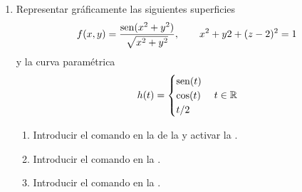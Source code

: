 \begin{enumerate}
\item Representar gráficamente las siguientes superficies
      \[
            f(x,y)=\dfrac{\operatorname{sen}(x^2+y^2)}{\sqrt{x^2+y^2}}, \qquad x^2+y 2+(z-2)^2=1
            \]
      y la curva paramétrica
      \[
      h(t)=
      \begin{cases}
      \operatorname{sen}(t) \\
      \cos(t) \\
      t/2
      \end{cases}
      t\in \mathbb{R}
      \]
      \begin{indication}
      \begin{enumerate}
      \item Introducir el comando  en la  de la  y activar la .
      \item Introducir el comando   en la .
      \item Introducir el comando   en la .
      \end{enumerate}
      \end{indication}
\end{enumerate}
